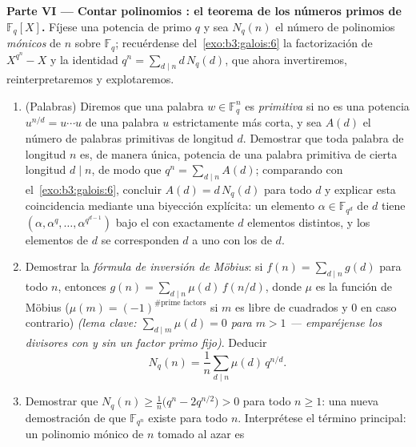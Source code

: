 \begin{problem}
\medskip
\noindent\textbf{Parte VI --- Contar polinomios
: el teorema de los
números primos de $\mathbb F_q[X]$.} Fíjese una potencia de primo $q$ y
sea $N_q(n)$ el número de polinomios \emph{mónicos
} de
 $n$ sobre $\mathbb F_q$;
recuérdense del~\cref{exo:b3:galois:6} la factorización de $X^{q^n} - X$
y la identidad $q^n = \sum_{d\mid n}d\,N_q(d)$, que ahora invertiremos,
reinterpretaremos y explotaremos.
\begin{enumerate}[resume]
  \item (Palabras) Diremos que una palabra $w \in \mathbb F_q^n$ es
  \emph{primitiva} si no es una potencia $u^{n/d} =
        u\cdots u$ de una palabra $u$ estrictamente más corta, y sea
  $A(d)$ el número de palabras primitivas de longitud $d$. Demostrar que
  toda palabra de longitud $n$ es, de manera única, potencia de una
  palabra primitiva de cierta longitud $d \mid n$, de modo que
  $q^n = \sum_{d \mid n}A(d)$; comparando con el~\cref{exo:b3:galois:6},
  concluir $A(d) = d\,N_q(d)$ para todo $d$ y explicar esta coincidencia
  mediante una biyección explícita: un elemento $\alpha \in
        \mathbb F_{q^d}$ de  $d$
  tiene 
  $(\alpha, \alpha^q, \dots, \alpha^{q^{d-1}})$ bajo el
   con exactamente $d$
  elementos distintos, y los elementos de
   $d$ se corresponden $d$ a uno
  con los  de
        $d$.
  \item Demostrar la \emph{fórmula de inversión de Möbius}: si $f(n) =
        \sum_{d\mid n}g(d)$ para todo $n$, entonces $g(n) =
        \sum_{d\mid n}\mu(d)\,f(n/d)$, donde $\mu$ es la función de
  Möbius ($\mu(m) = (-1)^{\#\text{prime
        factors}}$ si $m$ es libre de cuadrados y $0$ en caso contrario)
  \emph{(lema clave: $\sum_{d \mid m}\mu(d) = 0$ para $m >
        1$ --- emparéjense los divisores con y sin un factor primo
  fijo)}. Deducir
        \[
        N_q(n) = \frac1n\sum_{d \mid n}\mu(d)\,q^{n/d} .
        \]
  \item Demostrar que
  $N_q(n) \geq \frac1n\bigl(q^n - 2q^{n/2}\bigr) > 0$ para todo
  $n \geq 1$: una nueva demostración de que $\mathbb F_{q^n}$ existe
  para todo $n$. Interprétese el término principal: un polinomio mónico
  de  $n$ tomado al azar es

\end{enumerate}
\end{problem}

